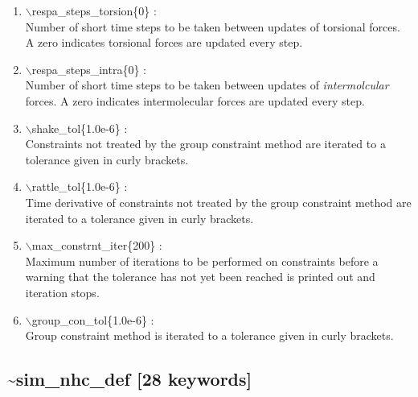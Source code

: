 \documentclass[12pt]{article}
\begin{document}
\begin{enumerate}
 \vspace{0.15in} 
 \item   $\backslash$respa\_steps\_torsion\{0\} : \\
    Number of short time steps to be taken between updates of torsional
    forces.  A zero indicates torsional forces are updated every step.

 \vspace{0.15in} 
  \item   $\backslash$respa\_steps\_intra\{0\} : \\
    Number of short time steps to be taken between updates of 
    {\it intermolcular} forces.  A zero indicates intermolecular forces are 
    updated every step.

 \vspace{0.15in} 
 \item   $\backslash$shake\_tol\{1.0e-6\} : \\
     Constraints not treated by the group constraint method are iterated to a
     tolerance given in curly brackets.


 \vspace{0.15in} 
 \item   $\backslash$rattle\_tol\{1.0e-6\} : \\
      Time derivative of constraints not treated by the group constraint 
      method are iterated to a tolerance given in curly brackets.


 \vspace{0.15in} 
 \item   $\backslash$max\_constrnt\_iter\{200\} : \\
     Maximum number of iterations to be performed on constraints before a 
     warning that the tolerance has not yet been reached is printed out and 
     iteration stops.

 \vspace{0.15in} 
 \item   $\backslash$group\_con\_tol\{1.0e-6\} : \\
     Group constraint method is iterated to a tolerance given in curly 
     brackets.

\end{enumerate}

\newpage
\subsection*{\bf \~{}sim\_nhc\_def [28 keywords]}
\end{document}

